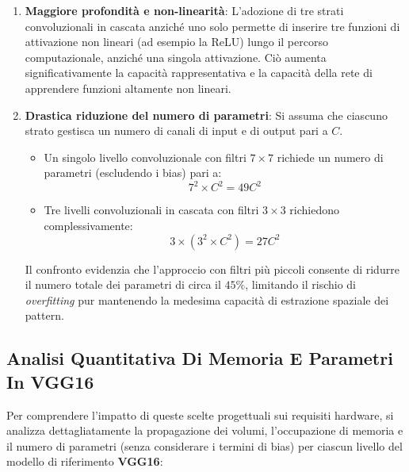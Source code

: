 ﻿\documentclass[11pt, a4paper]{article}
\begin{document}
\begin{enumerate}
    \item \textbf{Maggiore profondità e non-linearità}: L'adozione di tre strati convoluzionali in cascata anziché uno solo permette di inserire tre funzioni di attivazione non lineari (ad esempio la ReLU) lungo il percorso computazionale, anziché una singola attivazione. Ciò aumenta significativamente la capacità rappresentativa e la capacità della rete di apprendere funzioni altamente non lineari.
    \item \textbf{Drastica riduzione del numero di parametri}: Si assuma che ciascuno strato gestisca un numero di canali di input e di output pari a $C$.
    \begin{itemize}
        \item Un singolo livello convoluzionale con filtri $7 \times 7$ richiede un numero di parametri (escludendo i bias) pari a:
        \[
        7^2 \times C^2 = 49 C^2
        \]
        \item Tre livelli convoluzionali in cascata con filtri $3 \times 3$ richiedono complessivamente:
        \[
        3 \times (3^2 \times C^2) = 27 C^2
        \]
    \end{itemize}
    Il confronto evidenzia che l'approccio con filtri più piccoli consente di ridurre il numero totale dei parametri di circa il $45\%$, limitando il rischio di \emph{overfitting} pur mantenendo la medesima capacità di estrazione spaziale dei pattern.
\end{enumerate}

\subsection{Analisi Quantitativa Di Memoria E Parametri In VGG16}

Per comprendere l'impatto di queste scelte progettuali sui requisiti hardware, si analizza dettagliatamente la propagazione dei volumi, l'occupazione di memoria e il numero di parametri (senza considerare i termini di bias) per ciascun livello del modello di riferimento \textbf{VGG16}:

\end{document}
